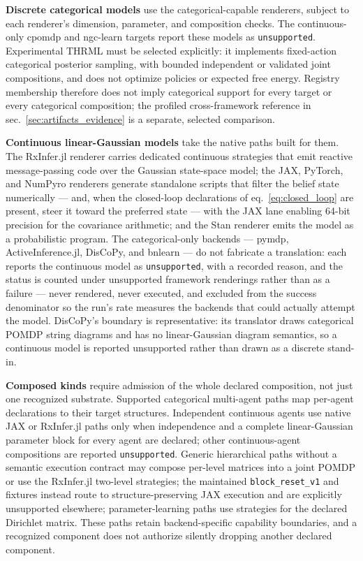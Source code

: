 \documentclass[
  english,
  9pt,
]{extarticle}
\begin{document}
\textbf{Discrete categorical models} use the categorical-capable
renderers, subject to each renderer's dimension, parameter, and
composition checks. The continuous-only cpomdp and ngc-learn targets
report these models as \texttt{unsupported}. Experimental THRML must be
selected explicitly: it implements fixed-action categorical posterior
sampling, with bounded independent or validated joint compositions, and
does not optimize policies or expected free energy. Registry membership
therefore does not imply categorical support for every target or every
categorical composition; the profiled cross-framework reference in
sec.~\ref{sec:artifacts_evidence} is a separate, selected comparison.

\textbf{Continuous linear-Gaussian models} take the native paths built
for them. The RxInfer.jl renderer carries dedicated continuous
strategies that emit reactive message-passing code over the Gaussian
state-space model; the JAX, PyTorch, and NumPyro renderers generate
standalone scripts that filter the belief state numerically --- and,
when the closed-loop declarations of eq.~\ref{eq:closed_loop} are
present, steer it toward the preferred state --- with the JAX lane
enabling 64-bit precision for the covariance arithmetic; and the Stan
renderer emits the model as a probabilistic program. The
categorical-only backends --- pymdp, ActiveInference.jl, DisCoPy, and
bnlearn --- do not fabricate a translation: each reports the continuous
model as \texttt{unsupported}, with a recorded reason, and the status is
counted under unsupported framework renderings rather than as a failure
--- never rendered, never executed, and excluded from the success
denominator so the run's rate measures the backends that could actually
attempt the model. DisCoPy's boundary is representative: its translator
draws categorical POMDP string diagrams and has no linear-Gaussian
diagram semantics, so a continuous model is reported unsupported rather
than drawn as a discrete stand-in.

\textbf{Composed kinds} require admission of the whole declared
composition, not just one recognized substrate. Supported categorical
multi-agent paths map per-agent declarations to their target structures.
Independent continuous agents use native JAX or RxInfer.jl paths only
when independence and a complete linear-Gaussian parameter block for
every agent are declared; other continuous-agent compositions are
reported \texttt{unsupported}. Generic hierarchical paths without a
semantic execution contract may compose per-level matrices into a joint
POMDP or use the RxInfer.jl two-level strategies; the maintained
\texttt{block\_reset\_v1} and 
fixtures instead route to structure-preserving JAX execution and are
explicitly unsupported elsewhere; parameter-learning paths use
strategies for the declared Dirichlet matrix. These paths retain
backend-specific capability boundaries, and a recognized component does
not authorize silently dropping another declared component.
\end{document}
